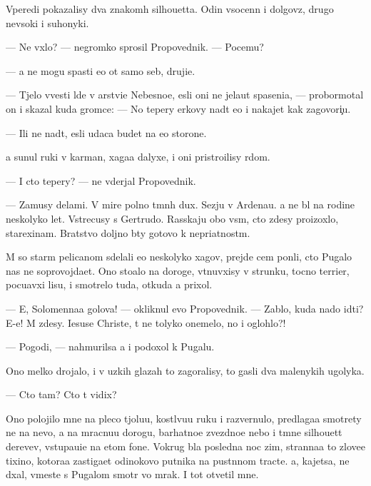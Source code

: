\documentclass[10pt]{book}
\begin{document}
Vperedi pokazalisy dva znakom{\yi}h silhouetta. Odin v{\yi}socenn{\yi}{\y} i dolgov{\ia}z{\yi}{\y}, drugo{\y} nev{\yi}soki{\y} i suhonyki{\y}.

— Ne v{\yi}xlo? — negromko sprosil Propovednik. — Pocemu?

— {\Y}a ne mogu spasti {\y}e{\y}o ot samo{\y} seb{\ia}, druji{\x}e.

— T{\ia}jelo vvesti l{\io}de{\y} v {\C}arstvi{\y}e Nebesno{\y}e, {\y}esli oni ne jela{\y}ut spaseni{\y}a, — probormotal on i skazal kuda gromce: — No tepery {\C}erkovy na{\y}d{\e}t {\y}e{\y}o i nakajet kak zagovor{\x}i{\c}u.

— Ili ne na{\y}d{\e}t, {\y}esli udaca budet na {\y}e{\y}o storone.

{\Y}a sunul ruki v karman{\yi}, xaga{\y}a dalyxe, i oni pristro{\y}ilisy r{\ia}dom.

— I cto tepery? — ne v{\yi}derjal Propovednik.

— Za{\y}musy delami. V mire polno t{\e}mn{\yi}h dux. S{\y}ezju v Ardenau. {\Y}a ne b{\yi}l na rodine neskolyko let. Vstrecusy s Gertrudo{\y}. Rasskaju obo vs{\e}m, cto zdesy proizoxlo, stare{\y}xinam. Bratstvo doljno b{\yi}ty gotovo k nepri{\y}atnost{\ia}m.

M{\yi} so star{\yi}m pelicanom sdelali {\y}e{\x}o neskolyko xagov, prejde cem pon{\ia}li, cto Pugalo nas ne soprovojda{\y}et. Ono sto{\y}alo na doroge, v{\yi}t{\ia}nuvxisy v strunku, tocno terrier, pocu{\y}avxi{\y} lisu, i smotrelo tuda, otkuda {\y}a prixol.

— E{\y}, Solomenna{\y}a golova! — okliknul {\y}evo Propovednik. — Zab{\yi}lo, kuda nado idti? E-e{\y}! M{\yi} zdesy. Iesuse Christe, t{\yi} ne tolyko onemelo, no i oglohlo?!

— Pogodi, — nahmurilsa {\y}a i podoxol k Pugalu.

Ono melko drojalo, i v uzkih glazah to zagoralisy, to gasli dva malenykih ugolyka.

— Cto tam? Cto t{\yi} vidix?

Ono polojilo mne na pleco t{\ia}jolu{\y}u, kostl{\ia}vu{\y}u ruku i razvernulo, predlaga{\y}a smotrety ne na nevo, a na mracnu{\y}u dorogu, barhatno{\y}e zvezdno{\y}e nebo i t{\e}mn{\yi}{\y}e silhouett{\yi} derev{\y}ev, v{\yi}stupa{\y}u{\x}i{\y}e na etom fone. Vokrug b{\yi}la posledn{\ia}{\y}a noc zim{\yi}, stranna{\y}a to{\y} zlove{\x}e{\y} tixino{\y}, kotora{\y}a zastiga{\y}et odinokovo putnika na pust{\yi}nnom tracte. {\Y}a, kajetsa, ne d{\yi}xal, vmeste s Pugalom smotr{\ia} vo mrak. I tot otvetil mne.
\end{document}
